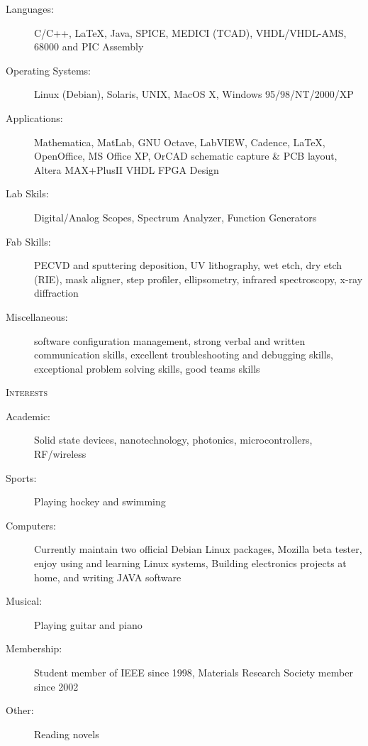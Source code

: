 \documentclass[letterpaper,11pt]{article}
\newcommand{\resheading}[1]{
  \begin{tcolorbox}
  \textsc{#1}
  \end{tcolorbox}
}
\begin{document}
\begin{description}
\item[Languages:]
C/C++, \LaTeX, Java, SPICE, MEDICI (TCAD), VHDL/VHDL-AMS, 68000 and PIC Assembly
\item[Operating Systems:]
Linux (Debian), Solaris, UNIX, MacOS X, Windows 95/98/NT/2000/XP
\item[Applications:]
Mathematica, MatLab, GNU Octave, LabVIEW, Cadence, \LaTeX, OpenOffice, MS Office XP, OrCAD schematic capture \& PCB layout, Altera MAX+PlusII VHDL FPGA Design
\item[Lab Skils:]
Digital/Analog Scopes, Spectrum Analyzer, Function Generators
\item[Fab Skills:]
PECVD and sputtering deposition, UV lithography, wet etch, dry etch (RIE), mask aligner, step profiler, ellipsometry, infrared spectroscopy, x-ray diffraction
\item[Miscellaneous:]
software configuration management, strong verbal and written communication skills, excellent troubleshooting and debugging skills, exceptional problem solving skills, good teams skills
\end{description}

\resheading{Interests}

\begin{description}
\item[Academic:] Solid state devices,  nanotechnology, photonics, microcontrollers, RF/wireless
\item[Sports:] Playing hockey and swimming
\item[Computers:] Currently maintain two official Debian Linux packages, Mozilla beta tester, enjoy using and learning Linux systems, Building electronics projects at home, and writing JAVA software
\item[Musical:] Playing guitar and piano
\item[Membership:] Student member of IEEE since 1998, Materials Research Society member since 2002
\item[Other:] Reading novels
\end{description}
\end{document}
